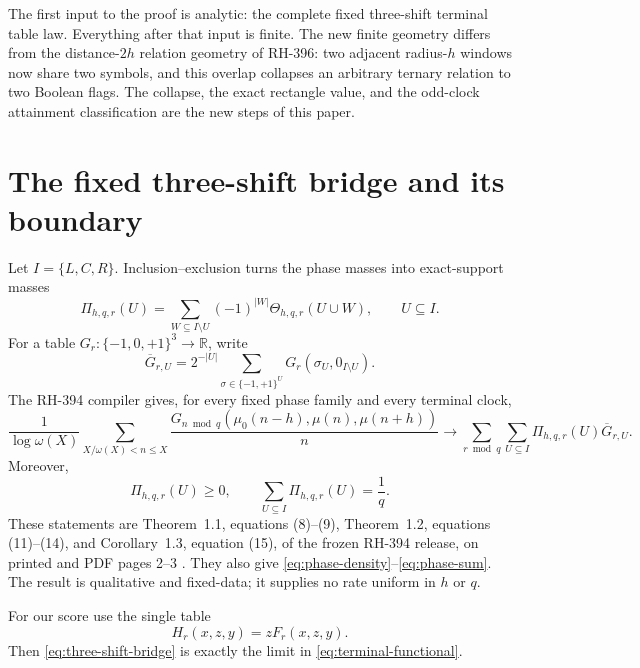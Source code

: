 \documentclass[11pt]{article}
\theoremstyle{definition}
\theoremstyle{remark}
\newcommand{\mob}{\mu}
\newcommand{\T}{\{-1,0,+1\}}
\begin{document}
The first input to the proof is analytic: the complete fixed three-shift
terminal table law.  Everything after that input is finite.  The new finite
geometry differs from the distance-\(2h\) relation geometry of RH-396:
two adjacent radius-\(h\) windows now share two symbols, and this overlap
collapses an arbitrary ternary relation to two Boolean flags.  The collapse,
the exact rectangle value, and the odd-clock attainment classification are
the new steps of this paper.

\section{The fixed three-shift bridge and its boundary}

Let \(I=\{L,C,R\}\).  Inclusion--exclusion turns the phase masses into
exact-support masses
\begin{equation}
 \Pi_{h,q,r}(U)=
 \sum_{W\subseteq I\setminus U}(-1)^{|W|}
 \Theta_{h,q,r}(U\cup W),
 \qquad U\subseteq I.
 \label{eq:pi-definition}
\end{equation}
For a table \(G_r:\T^3\to\mathbb R\), write
\begin{equation}
 \overline G_{r,U}=2^{-|U|}
 \sum_{\sigma\in\{-1,+1\}^{U}}
 G_r(\sigma_U,0_{I\setminus U}).
 \label{eq:stratum-average}
\end{equation}
The RH-394 compiler gives, for every fixed phase family and every terminal
clock,
\begin{equation}
 \frac1{\log\omega(X)}
 \sum_{X/\omega(X)<n\leq X}
 \frac{G_{n\bmod q}
 (\mob_0(n-h),\mob(n),\mob(n+h))}{n}
 \longrightarrow
 \sum_{r\bmod q}\sum_{U\subseteq I}
 \Pi_{h,q,r}(U)\overline G_{r,U}.
 \label{eq:three-shift-bridge}
\end{equation}
Moreover,
\begin{equation}
 \Pi_{h,q,r}(U)\geq0,\qquad
 \sum_{U\subseteq I}\Pi_{h,q,r}(U)=\frac1q.
 \label{eq:pi-mass}
\end{equation}
These statements are Theorem~1.1, equations (8)--(9), Theorem~1.2,
equations (11)--(14), and Corollary~1.3, equation (15), of the frozen
RH-394 release, on printed and PDF pages 2--3 \cite{RH394}.  They also
give \eqref{eq:phase-density}--\eqref{eq:phase-sum}.  The result is
qualitative and fixed-data; it supplies no rate uniform in \(h\) or \(q\).

For our score use the single table
\begin{equation}
 H_r(x,z,y)=zF_r(x,z,y).
 \label{eq:score-table}
\end{equation}
Then \eqref{eq:three-shift-bridge} is exactly the limit in
\eqref{eq:terminal-functional}.
\end{document}
